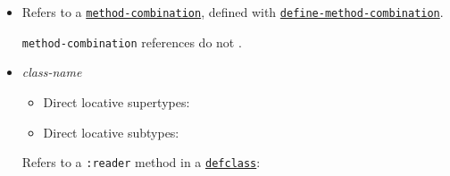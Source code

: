 \begin{itemize}
\begin{Shaded}
\begin{Highlighting}[]
\NormalTok{(}\FunctionTok{ }\NormalTok{(}
 \OperatorTok{\#\textquotesingle{}}\NormalTok{(}
\OperatorTok{\textgreater{}}
\OperatorTok{\textgreater{}}
\NormalTok{ () ()))}
\OperatorTok{\textgreater{}}
\end{Highlighting}
\end{Shaded}
\item
  \label{x-28METHOD-COMBINATION-20MGL-PAX-3ALOCATIVE-29}

  Refers to a
  \href{http://www.lispworks.com/documentation/HyperSpec/Body/t_meth_1.htm}{\texttt{method-combination}},
  defined with
  \href{http://www.lispworks.com/documentation/HyperSpec/Body/m_defi_4.htm}{\texttt{define-method-combination}}.

  \texttt{method-combination} references do not
  .
\item
  \label{x-28MGL-PAX-3AREADER-20MGL-PAX-3ALOCATIVE-29}
  \emph{class-name}

  \begin{itemize}
  \item
    Direct locative supertypes:
  \item
    Direct locative subtypes:
  \end{itemize}

  Refers to a \texttt{:reader} method in a
  \href{http://www.lispworks.com/documentation/HyperSpec/Body/m_defcla.htm}{\texttt{defclass}}:


\end{itemize}
